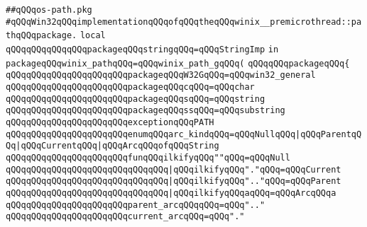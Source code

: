 \label{src/lib/std/src/win32/os-path.pkg}
\verb|##qQQqos-path.pkg|\newline
\newline
\newline
\newline
\verb|#qQQqWin32qQQqimplementationqQQqofqQQqtheqQQqwinix__premicrothread::pathqQQqpackage.|\newline
\newline
\newline
\newline
\verb|local|\newline
\verb|qQQqqQQqqQQqqQQqpackageqQQqstringqQQq=qQQqStringImp|\newline
\verb|in|\newline
\verb|packageqQQqwinix_pathqQQq=qQQqwinix_path_gqQQq(|\newline
\verb|qQQqqQQqpackageqQQq{|\newline
\verb|qQQqqQQqqQQqqQQqqQQqqQQqpackageqQQqW32GqQQq=qQQqwin32_general|\newline
\verb|qQQqqQQqqQQqqQQqqQQqqQQqpackageqQQqcqQQq=qQQqchar|\newline
\verb|qQQqqQQqqQQqqQQqqQQqqQQqpackageqQQqsqQQq=qQQqstring|\newline
\verb|qQQqqQQqqQQqqQQqqQQqqQQqpackageqQQqssqQQq=qQQqsubstring|\newline
\newline
\verb|qQQqqQQqqQQqqQQqqQQqqQQqexceptionqQQqPATH|\newline
\newline
\verb|qQQqqQQqqQQqqQQqqQQqqQQqenumqQQqarc_kindqQQq=qQQqNullqQQq|\verb#|qQQqParentqQQq|qQQqCurrentqQQq|qQQqArcqQQqofqQQqString#\newline
\newline
\verb|qQQqqQQqqQQqqQQqqQQqqQQqfunqQQqilkifyqQQq""qQQq=qQQqNull|\newline
\verb|qQQqqQQqqQQqqQQqqQQqqQQqqQQqqQQq|\verb#|qQQqilkifyqQQq"."qQQq=qQQqCurrent#\newline
\verb|qQQqqQQqqQQqqQQqqQQqqQQqqQQqqQQq|\verb#|qQQqilkifyqQQq".."qQQq=qQQqParent#\newline
\verb|qQQqqQQqqQQqqQQqqQQqqQQqqQQqqQQq|\verb#|qQQqilkifyqQQqaqQQq=qQQqArcqQQqa#\newline
\newline
\verb|qQQqqQQqqQQqqQQqqQQqqQQqparent_arcqQQqqQQq=qQQq".."|\newline
\verb|qQQqqQQqqQQqqQQqqQQqqQQqcurrent_arcqQQq=qQQq"."|\newline
\newline
